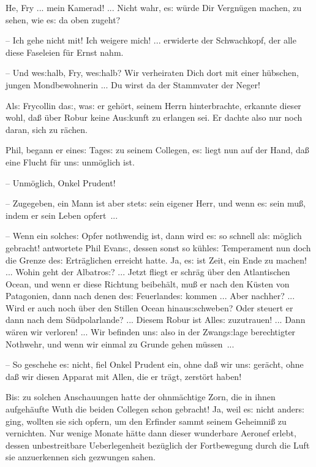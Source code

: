 \documentclass[oneside,12pt]{book}
\newcommand{\s}{s:}
\begin{document}
{\glqq}He, Fry ... mein Kamerad! ... Nicht wahr, e{\s} w\"urde Dir
Vergn\"ugen machen, zu sehen, wie e{\s} da oben zugeht?

-- Ich gehe nicht mit! Ich weigere mich! ... erwiderte der
Schwachkopf, der alle diese Faseleien f\"ur Ernst nahm.

-- Und we{\s}halb, Fry, we{\s}halb? Wir verheiraten Dich dort mit
einer h\"ubschen, jungen Mondbewohnerin ... Du wirst da der
Stammvater der Neger!{\grqq}

Al{\s} Frycollin da{\s}, wa{\s} er geh\"ort, seinem Herrn
hinterbrachte, erkannte dieser wohl, da{\ss} \"uber Robur keine
Au{\s}kunft zu erlangen sei. Er dachte also nur noch daran, sich zu
r\"achen.

{\glqq}Phil, begann er eine{\s} Tage{\s} zu seinem Collegen, e{\s}
liegt nun auf der Hand, da{\ss} eine Flucht f\"ur un{\s} unm\"oglich
ist.

-- Unm\"oglich, Onkel Prudent!

-- Zugegeben, ein Mann ist aber stet{\s} sein eigener Herr, und wenn
e{\s} sein mu{\ss}, indem er sein Leben opfert~...

-- Wenn ein solche{\s} Opfer nothwendig ist, dann wird e{\s} so
schnell al{\s} m\"oglich gebracht! antwortete Phil Evan{\s}, dessen
sonst so k\"uhle{\s} Temperament nun doch die Grenze de{\s}
Ertr\"aglichen erreicht hatte. Ja, e{\s} ist Zeit, ein Ende zu
machen! ... Wohin geht der {\glqq}Albatro{\s}{\grqq}? ... Jetzt
fliegt er schr\"ag \"uber den Atlantischen Ocean, und wenn er diese
Richtung beibeh\"alt, mu{\ss} er nach den K\"usten von Patagonien,
dann nach denen de{\s} Feuerlande{\s} kommen ... Aber nachher? ...
Wird er auch noch \"uber den Stillen Ocean hinau{\s}schweben? Oder
steuert er dann nach dem S\"udpolarlande? ... Diesem Robur ist
Alle{\s} zuzutrauen! ... Dann w\"aren wir verloren! ... Wir befinden
un{\s} also in der Zwang{\s}lage berechtigter Nothwehr, und wenn wir
einmal zu Grunde gehen m\"ussen~...

-- So geschehe e{\s} nicht, fiel Onkel Prudent ein, ohne da{\ss} wir
un{\s} ger\"acht, ohne da{\ss} wir diesen Apparat mit Allen, die er
tr\"agt, zerst\"ort haben!{\grqq}

Bi{\s} zu solchen Anschauungen hatte der ohnm\"achtige Zorn, die in
ihnen aufgeh\"aufte Wuth die beiden Collegen schon gebracht! Ja, weil
e{\s} nicht ander{\s} ging, wollten sie sich opfern, um den Erfinder
sammt seinem Geheimni{\ss} zu vernichten. Nur wenige Monate h\"atte
dann dieser wunderbare Aeronef erlebt, dessen unbestreitbare
Ueberlegenheit bez\"uglich der Fortbewegung durch die Luft sie
anzuerkennen sich gezwungen sahen.
\end{document}
